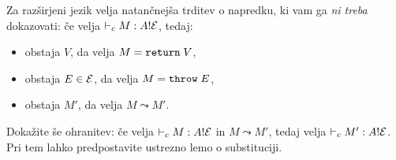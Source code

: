 \documentclass[arhiv]{../izpit}
\begin{document}
%
Za razširjeni jezik velja natančnejša trditev o napredku, ki vam ga \emph{ni treba} dokazovati: če velja $\vdash_c M : A ! \mathcal{E}$, tedaj:
\begin{itemize}
  \item obstaja $V$, da velja $M = \mathtt{return}\;V$,
  \item obstaja $E \in \mathcal{E}$, da velja $M = \mathtt{throw}\;E$,
  \item obstaja $M'$, da velja $M \leadsto M'$.
\end{itemize}
%
Dokažite še ohranitev: če velja $\vdash_c M : A ! \mathcal{E}$ in $M \leadsto M'$, tedaj velja $\vdash_c M' : A ! \mathcal{E}$. Pri tem lahko predpostavite ustrezno lemo o substituciji.

\nadaljevanje
\end{document}

